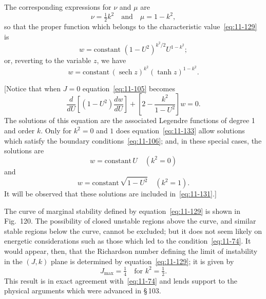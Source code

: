 The corresponding expressions for $\nu$ and $\mu$ are
\begin{equation}
\label{eq:11-130}
\nu = \tfrac{1}{2}k^2 \quad\text{and}\quad \mu = 1-k^2,
\end{equation}
so that the proper function which belongs to the characteristic value~\eqref{eq:11-129} is
\begin{equation}
\label{eq:11-131}
w = \text{constant } (1-U^2)^{k^2/2}U^{1-k^2};
\end{equation}
or, reverting to the variable $z$, we have
\begin{equation}
\label{eq:11-132}
w = \text{constant}\,(\operatorname{sech} z)^{k^2}(\tanh z)^{1-k^2}.
\end{equation}

[Notice that when $J = 0$ equation~\eqref{eq:11-105} becomes
\begin{equation}
\label{eq:11-133}
\frac{d}{dU}\!\left[(1-U^2)\frac{dw}{dU}\right]+\left[2-\frac{k^2}{1-U^2}\right]w = 0.
\end{equation}
The solutions of this equation are the associated Legendre functions of degree 1 and order $k$. Only for $k^2 = 0$ and $1$ does equation~\eqref{eq:11-133} allow solutions which satisfy the boundary conditions~\eqref{eq:11-106}; and, in these special cases, the solutions are
\begin{equation}
\label{eq:11-134}
w = \text{constant}\,U \quad (k^2 = 0)
\end{equation}
and
\begin{equation}
w = \text{constant}\,\sqrt{1-U^2} \quad (k^2 = 1).
\end{equation}
It will be observed that these solutions are included in~\eqref{eq:11-131}.]


The curve of marginal stability defined by equation~\eqref{eq:11-129} is shown in Fig.\ 120. The possibility of closed unstable regions above the curve, and similar stable regions below the curve, cannot be excluded; but it does not seem likely on energetic considerations such as those which led to the condition~\eqref{eq:11-74}. It would appear, then, that the Richardson number defining the limit of instability in the $(J,k)$ plane is determined by equation~\eqref{eq:11-129}; it is given by
\begin{equation}
\label{eq:11-135}
J_{\max} = \tfrac{1}{4} \quad\text{for } k^2 = \tfrac{1}{2}.
\end{equation}
This result is in exact agreement with~\eqref{eq:11-74} and lends support to the physical arguments which were advanced in \S\,103.

